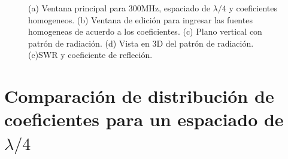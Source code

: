 \documentclass[11pt]{book}
\begin{document}
\begin{figure}[h]
	\caption{(a) Ventana principal para 300MHz, espaciado de $\lambda / 4$ y coeficientes homogeneos. (b) Ventana de edición para ingresar las fuentes homogeneas de acuerdo a los coeficientes. (c) Plano vertical con patrón de radiación. (d) Vista en 3D del patrón de radiación. (e)SWR y coeficiente de refleción.}
\end{figure}

\newpage

\section{Comparación de distribución de coeficientes para un espaciado de $\lambda/4$}
\end{document}
